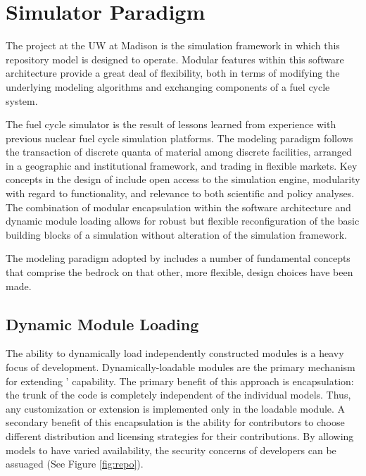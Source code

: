 \section{\Cyclus Simulator Paradigm }

The \Cyclus project at the \gls{UW} at Madison is the 
simulation framework in which this repository model is designed to 
operate.  Modular features within this software architecture provide a 
great deal of flexibility, both in terms of modifying the underlying 
modeling algorithms and exchanging components of a fuel cycle system.

The \Cyclus fuel cycle simulator is the  result of lessons learned 
from experience with previous nuclear fuel cycle simulation platforms.  
The modeling paradigm follows the transaction of discrete quanta of 
material among discrete facilities, arranged in a geographic and 
institutional framework, and trading in
flexible markets. Key concepts in the design of \Cyclus include open
access to the simulation engine, modularity with regard to
functionality, and relevance to both scientific and policy
analyses. The combination of modular encapsulation within the
software architecture and dynamic module loading allows for robust but 
flexible reconfiguration of the basic building blocks of a simulation 
without alteration of the simulation framework.  

The modeling paradigm adopted by \Cyclus includes a number of
fundamental concepts that comprise the bedrock on that other, more
flexible, design choices have been made. 

\subsection{Dynamic Module Loading}

The ability to dynamically load independently constructed modules is a
heavy focus of \Cyclus development. Dynamically-loadable modules are
the primary mechanism for extending \Cyclus' capability. The primary
benefit of this approach is encapsulation: the trunk of the code is
completely independent of the individual models. Thus, any
customization or extension is implemented only in the loadable
module. A secondary benefit of this encapsulation is the ability for
contributors to choose different distribution and licensing strategies
for their contributions. By allowing models to have varied
availability, the security concerns of developers can be
assuaged (See Figure \ref{fig:repo}). 

